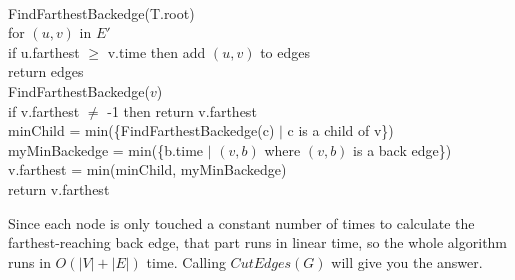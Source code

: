 \documentclass[11pt]{article}
\begin{document}
\begin{solution}
\begin{itemize}
\begin{algo}
                \\ FindFarthestBackedge(T.root)
                \\ for $(u, v)$ in $E'$ \+
                \\ if u.farthest $\geq$ v.time then add $(u, v)$ to edges \-
                \\ return edges \-
                \\ FindFarthestBackedge($v$) \+
                \\ if v.farthest $\neq$ -1 then return v.farthest
                \\ minChild = min(\{FindFarthestBackedge(c) $\mid$ c is a child of v\})
                \\ myMinBackedge = min(\{b.time $\mid$ $(v, b)$ where $(v, b)$ is a back edge\})
                \\ v.farthest = min(minChild, myMinBackedge)
                \\ return v.farthest
            \end{algo}
            Since each node is only touched a constant number of times to calculate the farthest-reaching back edge, that part runs in linear time, so the whole algorithm runs in $O(|V| + |E|)$ time. Calling $CutEdges(G)$ will give you the answer.
    \end{itemize}
\end{solution}
\end{document}
